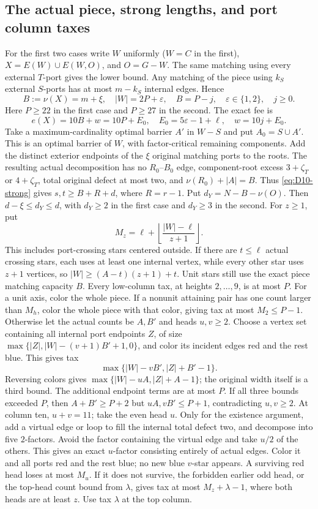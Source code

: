 \documentclass[11pt,a4paper]{article}
\theoremstyle{definition}
\begin{document}
\subsection{The actual piece, strong lengths, and port column taxes}
For the first two cases write $W$ uniformly ($W=C$ in the first), $X=E(W)\cup E(W,O)$, and $O=G-W$. The same matching using every external $T$-port gives the lower bound. Any matching of the piece using $k_S$ external $S$-ports has at most $m-k_S$ internal edges. Hence
\[
 B:=\nu(X)=m+\xi,\quad |W|=2P+\varepsilon,\quad
 B=P-j,\quad \varepsilon\in\{1,2\},\quad j\ge0.
\]
Here $P\ge22$ in the first case and $P\ge27$ in the second. The exact fee is
\[
 e(X)=10B+w=10P+E_0,\quad E_0=5\varepsilon-1+\ell,\quad w=10j+E_0.
\]
Take a maximum-cardinality optimal barrier $A'$ in $W-S$ and put $A_0=S\cup A'$. This is an optimal barrier of $W$, with factor-critical remaining components. Add the distinct exterior endpoints of the $\xi$ original matching ports to the roots. The resulting actual decomposition has no $R_0$--$B_0$ edge, component-root excess $3+\zeta_T$ or $4+\zeta_T$, total original defect at most two, and $\nu(R_0)+|A|=B$. Thus \eqref{eq:D10-strong} gives $s,t\ge B+R+d$, where $R=r-1$. Put
$d_Y=N-B-\nu(O)$. Then $d-\xi\le d_Y\le d$, with $d_Y\ge2$ in the first case and $d_Y\ge3$ in the second.
For $z\ge1$, put
\[
 M_z=\ell+\left\lfloor\frac{|W|-\ell}{z+1}\right\rfloor.
\]
This includes port-crossing stars centered outside. If there are $t\le\ell$ actual crossing stars, each uses at least one internal vertex, while every other star uses $z+1$ vertices, so $|W|\ge(A-t)(z+1)+t$. Unit stars still use the exact piece matching capacity $B$.
Every low-column tax, at heights $2,\ldots,9$, is at most $P$. For a unit axis, color the whole piece. If a nonunit attaining pair has one count larger than $M_h$, color the whole piece with that color, giving tax at most $M_2\le P-1$. Otherwise let the actual counts be $A,B'$ and heads $u,v\ge2$. Choose a vertex set containing all internal port endpoints $Z$, of size
$\max\{|Z|,|W|-(v+1)B'+1,0\}$, and color its incident edges red and the rest blue. This gives tax
\[
 \max\{|W|-vB',|Z|+B'-1\}.
\]
Reversing colors gives $\max\{|W|-uA,|Z|+A-1\}$; the original width itself is a third bound. The additional endpoint terms are at most $P$. If all three bounds exceeded $P$, then $A+B'\ge P+2$ but $uA,vB'\le P+1$, contradicting $u,v\ge2$.
At column ten, $u+v=11$; take the even head $u$. Only for the existence argument, add a virtual edge or loop to fill the internal total defect two, and decompose into five $2$-factors. Avoid the factor containing the virtual edge and take $u/2$ of the others. This gives an exact $u$-factor consisting entirely of actual edges. Color it and all ports red and the rest blue; no new blue $v$-star appears. A surviving red head loses at most $M_u$. If it does not survive, the forbidden earlier odd head, or the top-head count bound from $\lambda$, gives tax at most $M_z+\lambda-1$, where both heads are at least $z$. Use tax $\lambda$ at the top column.
\end{document}
